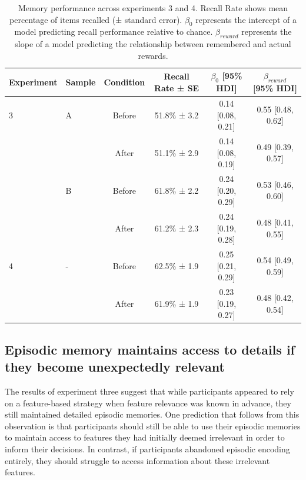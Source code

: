 \documentclass[10pt,letterpaper]{article}
\begin{document}
\begin{table}[t]
\centering
\begin{tabular}{llcccc}
\hline
Experiment & Sample & Condition & Recall Rate ± SE & $\beta_0$ [95\% HDI] & $\beta_{reward}$ [95\% HDI] \\
\hline
3 & A & Before & 51.8\% ± 3.2 & 0.14 [0.08, 0.21] & 0.55 [0.48, 0.62] \\
  &   & After & 51.1\% ± 2.9 & 0.14 [0.08, 0.19] & 0.49 [0.39, 0.57] \\
  & B & Before & 61.8\% ± 2.2 & 0.24 [0.20, 0.29] & 0.53 [0.46, 0.60] \\
  &   & After & 61.2\% ± 2.3 & 0.24 [0.19, 0.28] & 0.48 [0.41, 0.55] \\
4 & - & Before & 62.5\% ± 1.9 & 0.25 [0.21, 0.29] & 0.54 [0.49, 0.59] \\
  &   & After & 61.9\% ± 1.9 & 0.23 [0.19, 0.27] & 0.48 [0.42, 0.54] \\
\hline
\end{tabular}
\caption{Memory performance across experiments 3 and 4. Recall Rate shows mean percentage of items recalled (± standard error). $\beta_0$ represents the intercept of a model predicting recall performance relative to chance. $\beta_{reward}$ represents the slope of a model predicting the relationship between remembered and actual rewards.}
\label{tab:memory}
\end{table}

\subsection{Episodic memory maintains access to details if they become unexpectedly relevant}

The results of experiment three suggest that while participants appeared to rely on a feature-based strategy when feature relevance was known in advance, they still maintained detailed episodic memories. One prediction that follows from this observation is that participants should still be able to use their episodic memories to maintain access to features they had initially deemed irrelevant in order to inform their decisions. In contrast, if participants abandoned episodic encoding entirely, they should struggle to access information about these irrelevant features.
\end{document}
